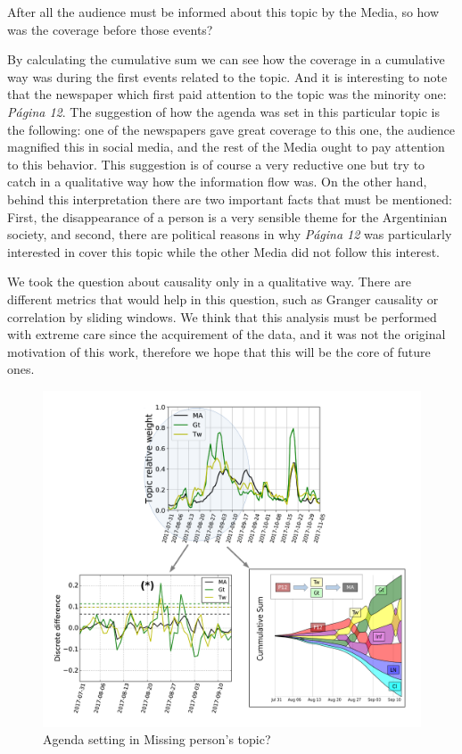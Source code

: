 After all the audience must be informed about this topic by the Media, so how was the coverage before those events?
\par By calculating the cumulative sum we can see how the coverage in a cumulative way was during the first events related to the topic. And it is interesting to note that the newspaper which first paid attention to the topic was the minority one: \emph{Página 12}. 
The suggestion of how the agenda was set in this particular topic is the following: one of the newspapers gave great coverage to this one, the audience magnified this in social media, and the rest of the Media ought to pay attention to this behavior. This suggestion is of course a very reductive one but try to catch in a qualitative way how the information flow was.
On the other hand, behind this interpretation there are two important facts that must be mentioned: First, the disappearance of a person is a very sensible theme for the Argentinian society, and second, there are political reasons in why \emph{Página 12} was particularly interested in cover this topic while the other Media did not follow this interest.

\par We took the question about causality only in a qualitative way. 
There are different metrics that would help in this question, such as Granger causality or correlation by sliding windows. We think that this analysis must be performed with extreme care since the acquirement of the data, and it was not the original motivation of this work, therefore we hope that this will be the core of future ones.


\begin{figure}
\includegraphics[width = \textwidth]{images/Fig8.pdf}
\caption{Agenda setting in Missing person's topic?}
\label{fig:Maldonado_setagenda}
\end{figure}




